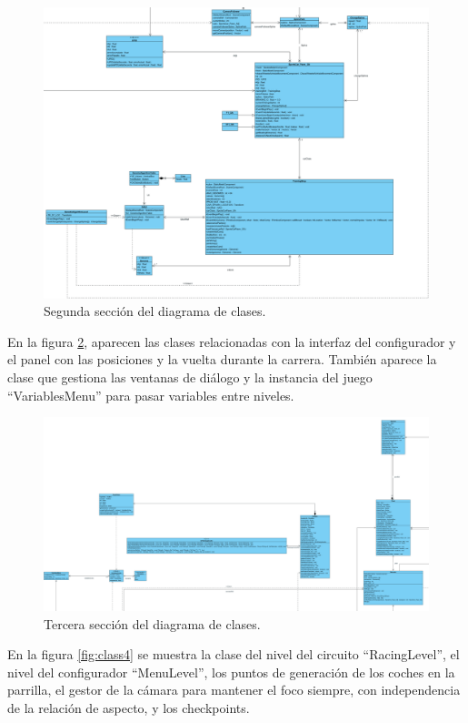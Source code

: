 \begin{figure}[H]
    \centering
    \includegraphics[width=\textwidth]{imagenes/classDiagram2.png}
    \caption{Segunda sección del diagrama de clases.}
    \label{fig:class2}
\end{figure}

En la figura \ref{fig:class3}, aparecen las clases relacionadas con la interfaz del configurador y el panel con las posiciones y la vuelta durante la carrera. También aparece la clase que gestiona las ventanas de diálogo y la instancia del juego ``VariablesMenu'' para pasar variables entre niveles.

\begin{figure}[H]
    \centering
    \includegraphics[width=\textwidth]{imagenes/classDiagram3.png}
    \caption{Tercera sección del diagrama de clases.}
    \label{fig:class3}
\end{figure}

En la figura \ref{fig:class4} se muestra la clase del nivel del circuito ``RacingLevel'', el nivel del configurador ``MenuLevel'', los puntos de generación de los coches en la parrilla, el gestor de la cámara para mantener el foco siempre, con independencia de la relación de aspecto, y los checkpoints.

